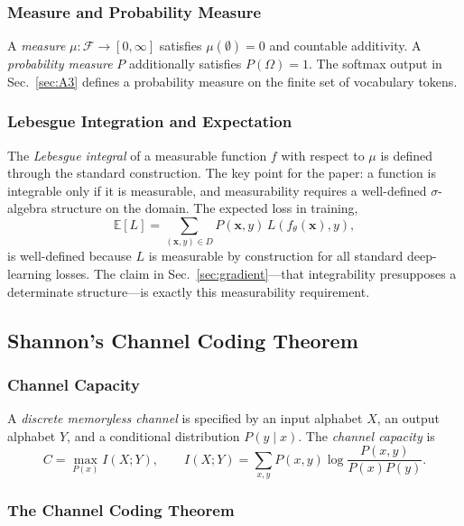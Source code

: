 \documentclass[a4paper,twocolumn,11pt]{article}
\begin{document}
\subsubsection*{Measure and Probability Measure}

A \emph{measure} $\mu : \mathcal{F} \to [0, \infty]$ satisfies $\mu(\emptyset) = 0$ and countable additivity. A \emph{probability measure} $P$ additionally satisfies $P(\Omega) = 1$. The softmax output in Sec.~\ref{sec:A3} defines a probability measure on the finite set of vocabulary tokens.

\subsubsection*{Lebesgue Integration and Expectation}

The \emph{Lebesgue integral} of a measurable function $f$ with respect to $\mu$ is defined through the standard construction. The key point for the paper: a function is integrable only if it is measurable, and measurability requires a well-defined $\sigma$-algebra structure on the domain. The expected loss in training,
\[
\mathbb{E}[L] = \sum_{(\mathbf{x}, y) \in D} P(\mathbf{x}, y)\, L(f_\theta(\mathbf{x}), y),
\]
is well-defined because $L$ is measurable by construction for all standard deep-learning losses. The claim in Sec.~\ref{sec:gradient}---that integrability presupposes a determinate structure---is exactly this measurability requirement.

\subsection{Shannon's Channel Coding Theorem}
\label{sec:A6}

\subsubsection*{Channel Capacity}

A \emph{discrete memoryless channel} is specified by an input alphabet $X$, an output alphabet $Y$, and a conditional distribution $P(y \mid x)$. The \emph{channel capacity} is
\[
C = \max_{P(x)} I(X; Y), \qquad I(X;Y) = \sum_{x, y} P(x,y) \log\frac{P(x,y)}{P(x)P(y)}.
\]

\subsubsection*{The Channel Coding Theorem~\cite{Shannon1948}}
\end{document}
